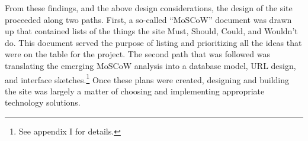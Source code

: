 From these findings, and the above design considerations, the design of the site proceeded along two paths. First, a so-called ``MoSCoW'' document was drawn up that contained lists of the things the site Must, Should, Could, and Wouldn't do. This document served the purpose of listing and prioritizing all the ideas that were on the table for the project. The second path that was followed was translating the emerging MoSCoW analysis into a database model, URL design, and interface sketches.\footnote{See appendix I for details.} Once these plans were created, designing and building the site was largely a matter of choosing and implementing appropriate technology solutions.
